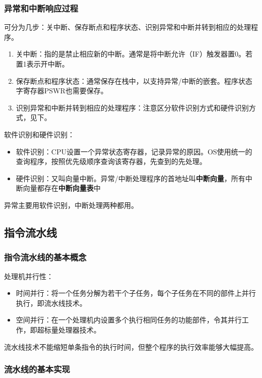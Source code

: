 \documentclass[12pt, a4paper, oneside]{ctexart}
\begin{document}
\subsubsection{异常和中断响应过程}

可分为几步：关中断、保存断点和程序状态、识别异常和中断并转到相应的处理程序。

\begin{enumerate}
  \item 关中断：指的是禁止相应新的中断。通常是将中断允许（IF）触发器置0。若置1表示开中断。
  \item 保存断点和程序状态：通常保存在栈中，以支持异常/中断的嵌套。程序状态字寄存器PSWR也需要保存。
  \item 识别异常和中断并转到相应的处理程序：注意区分软件识别方式和硬件识别方式，见下。
\end{enumerate}

软件识别和硬件识别：
\begin{itemize}
  \item 软件识别：CPU设置一个异常状态寄存器，记录异常的原因。OS使用统一的查询程序，按照优先级顺序查询该寄存器，先查到的先处理。
  \item 硬件识别：又叫向量中断。异常/中断处理程序的首地址叫\textbf{中断向量}，所有中断向量都存在\textbf{中断向量表}中
\end{itemize}
异常主要用软件识别，中断处理两种都用。

\subsection{指令流水线}

\subsubsection{指令流水线的基本概念}

处理机并行性：
\begin{itemize}
  \item 时间并行：将一个任务分解为若干个子任务，每个子任务在不同的部件上并行执行，即流水线技术。
  \item 空间并行：在一个处理机内设置多个执行相同任务的功能部件，令其并行工作，即超标量处理器技术。
\end{itemize}

流水线技术不能缩短单条指令的执行时间，但整个程序的执行效率能够大幅提高。

\subsubsection{流水线的基本实现}
\end{document}
